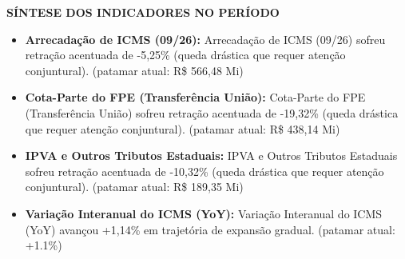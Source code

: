\documentclass[10pt,a4paper]{article}
\begin{document}
{\hfill%
%
}


\vspace{0.10cm}

\par\vspace{0.05cm}
\par\vspace{4pt}
{\fontsize{7.8}{9.4}\selectfont\bfseries\color{corprimaria}\MakeUppercase{Síntese dos Indicadores no Período}}\par\vspace{2pt}
{\scriptsize\color{cinzatexto}
\begin{itemize}[leftmargin=10pt, itemsep=1.2pt, topsep=1pt, parsep=0pt]
   \item \textbf{\color{corprimaria}Arrecadação de ICMS (09/26):} Arrecadação de ICMS (09/26) sofreu retração acentuada de -5,25\% (queda drástica que requer atenção conjuntural). (patamar atual: R\$ 566,48 Mi)
   \item \textbf{\color{corprimaria}Cota-Parte do FPE (Transferência União):} Cota-Parte do FPE (Transferência União) sofreu retração acentuada de -19,32\% (queda drástica que requer atenção conjuntural). (patamar atual: R\$ 438,14 Mi)
   \item \textbf{\color{corprimaria}IPVA e Outros Tributos Estaduais:} IPVA e Outros Tributos Estaduais sofreu retração acentuada de -10,32\% (queda drástica que requer atenção conjuntural). (patamar atual: R\$ 189,35 Mi)
   \item \textbf{\color{corprimaria}Variação Interanual do ICMS (YoY):} Variação Interanual do ICMS (YoY) avançou +1,14\% em trajetória de expansão gradual. (patamar atual: +1.1\%)
\end{itemize}
}
\par\vspace{0.05cm}
\end{document}
